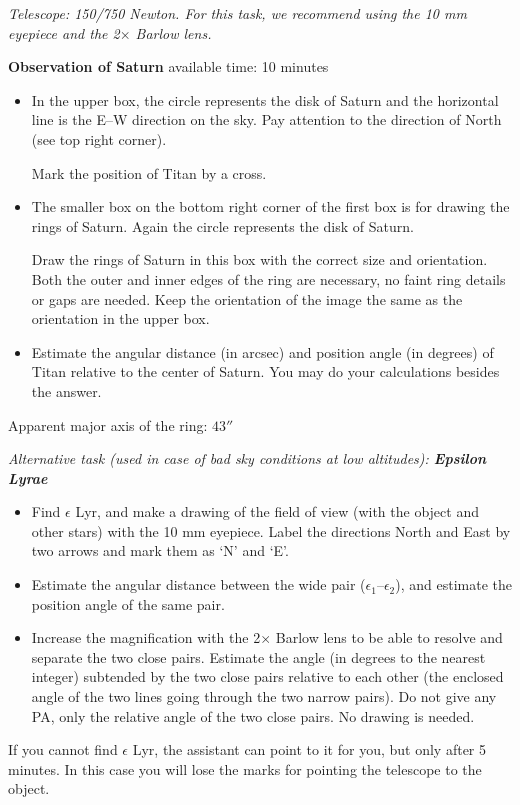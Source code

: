 \emph{Telescope: 150/750 Newton. For this task, we recommend using the 10 mm
eyepiece and the 2$\times$ Barlow lens.}

\textbf{Observation of Saturn} \hfill available time: 10 minutes

\begin{itemize}
\item In the upper box, the circle represents the disk of Saturn and the
  horizontal line is the E--W direction on the sky. Pay attention to the
  direction of North (see top right corner).

  Mark the position of Titan by a cross.
\item The smaller box on the bottom right corner of the first box is for
  drawing the rings of Saturn. Again the circle represents the disk of
  Saturn.

  Draw the rings of Saturn in this box with the correct size and
  orientation. Both the outer and inner edges of the ring are necessary, no
  faint ring details or gaps are needed. Keep the orientation of the image
  the same as the orientation in the upper box.
\item Estimate the angular distance (in arcsec) and position angle (in
  degrees) of Titan relative to the center of Saturn. You may do your
  calculations besides the answer.
\end{itemize}

Apparent major axis of the ring: $43''$


\medskip
\emph{Alternative task (used in case of bad sky conditions at low
altitudes): \textbf{Epsilon Lyrae}}

\begin{itemize}
\item Find $\epsilon$ Lyr, and make a drawing of the field of view (with the
  object and other stars) with the 10 mm eyepiece. Label the directions
  North and East by two arrows and mark them as `N' and `E'.
\item Estimate the angular distance between the wide pair
  ($\epsilon_1$--$\epsilon_2$), and estimate the position angle of the same
  pair.
\item Increase the magnification with the 2$\times$ Barlow lens to be able
  to resolve and separate the two close pairs. Estimate the angle (in
  degrees to the nearest integer) subtended by the two close pairs relative
  to each other (the enclosed angle of the two lines going through the two
  narrow pairs). Do not give any PA, only the relative angle of the two
  close pairs. No drawing is needed.
\end{itemize}

If you cannot find $\epsilon$ Lyr, the assistant can point to it for you,
but only after 5 minutes. In this case you will lose the marks for pointing
the telescope to the object.

